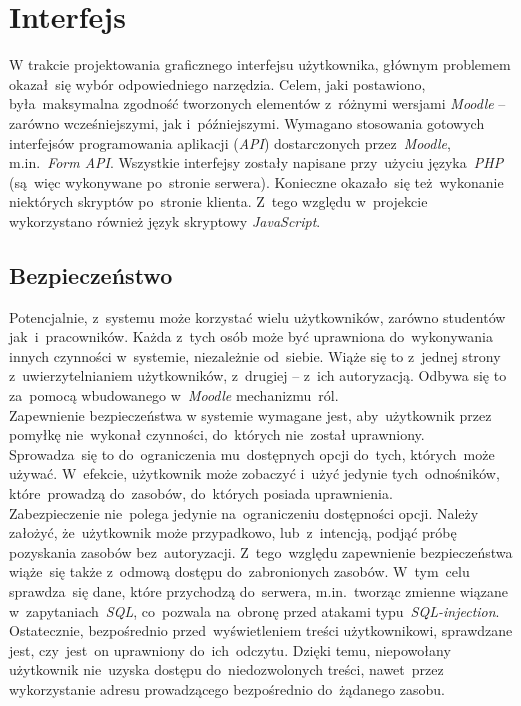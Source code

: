 \section{Interfejs}
\label{Chapter65}

W trakcie projektowania graficznego interfejsu użytkownika, głównym problemem okazał~się wybór odpowiedniego narzędzia. Celem, jaki postawiono, była~maksymalna zgodność tworzonych elementów z~różnymi wersjami \textit{Moodle} -- zarówno wcześniejszymi, jak i~późniejszymi. Wymagano stosowania gotowych interfejsów programowania aplikacji (\textit{API}) dostarczonych przez~\textit{Moodle}, m.in.~\textit{Form API}. Wszystkie interfejsy zostały napisane przy~użyciu języka~\textit{PHP} (są~więc wykonywane po~stronie serwera). Konieczne okazało~się też~wykonanie niektórych skryptów po~stronie klienta. Z~tego względu w~projekcie wykorzystano również język skryptowy \textit{JavaScript}.

\subsection{Bezpieczeństwo}
\label{Chapter651}

Potencjalnie, z~systemu może korzystać wielu użytkowników, zarówno studentów jak~i~pracowników. Każda z~tych osób może być uprawniona do~wykonywania innych czynności w~systemie, niezależnie od~siebie. Wiąże się to z~jednej strony z~uwierzytelnianiem użytkowników, z~drugiej -- z~ich autoryzacją. Odbywa się to za~pomocą wbudowanego w~\textit{Moodle} mechanizmu~ról. \\

Zapewnienie bezpieczeństwa w systemie wymagane jest, aby~użytkownik przez pomyłkę nie~wykonał czynności, do~których nie~został uprawniony. Sprowadza~się to do~ograniczenia mu~dostępnych opcji do~tych, których~może używać. W~efekcie, użytkownik może zobaczyć i~użyć jedynie tych~odnośników, które~prowadzą do~zasobów, do~których posiada uprawnienia. \\

Zabezpieczenie nie~polega jedynie na~ograniczeniu dostępności opcji. Należy założyć, że~użytkownik może przypadkowo, lub~z~intencją, podjąć próbę pozyskania zasobów bez~autoryzacji. Z~tego~względu zapewnienie bezpieczeństwa wiąże~się także z~odmową dostępu do~zabronionych zasobów. W~tym~celu sprawdza~się dane, które przychodzą do~serwera, m.in.~tworząc zmienne wiązane w~zapytaniach~\textit{SQL}, co~pozwala na~obronę przed atakami typu~\textit{SQL-injection}. Ostatecznie, bezpośrednio przed~wyświetleniem treści użytkownikowi, sprawdzane jest, czy~jest~on uprawniony do~ich~odczytu. Dzięki temu, niepowołany użytkownik nie~uzyska dostępu do~niedozwolonych treści, nawet~przez wykorzystanie adresu prowadzącego bezpośrednio do~żądanego zasobu.